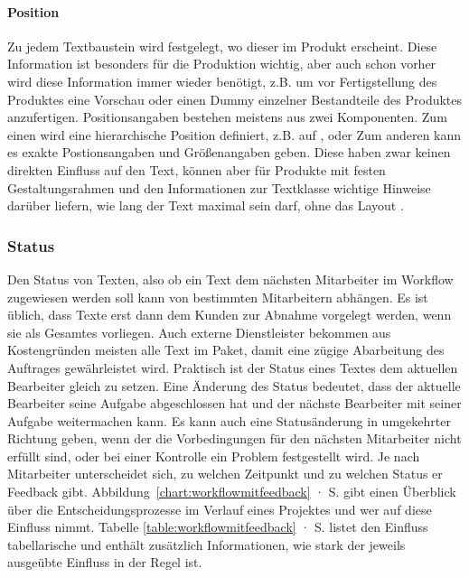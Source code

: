 \paragraph{Position} Zu jedem Textbaustein wird festgelegt, wo dieser im Produkt erscheint. Diese Information ist besonders für die Produktion wichtig, aber auch schon vorher wird diese Information immer wieder benötigt, z.B. um vor Fertigstellung des Produktes eine Vorschau oder einen Dummy einzelner Bestandteile des Produktes anzufertigen. Positionsangaben bestehen meistens aus zwei Komponenten. Zum einen wird eine hierarchische Position definiert, z.B. auf , oder  Zum anderen kann es exakte Postionsangaben und Größenangaben geben. Diese haben zwar keinen direkten Einfluss auf den Text, können aber für Produkte mit festen Gestaltungsrahmen und den Informationen zur Textklasse wichtige Hinweise darüber liefern, wie lang der Text maximal sein darf, ohne das Layout .

\subsubsection{Status}\label{l:konzept-workflow-status}

Den Status von Texten, also ob ein Text dem nächsten Mitarbeiter im Workflow zugewiesen werden soll kann von bestimmten Mitarbeitern abhängen. Es ist üblich, dass Texte erst dann dem Kunden zur Abnahme vorgelegt werden, wenn sie als Gesamtes vorliegen. Auch externe Dienstleister bekommen aus Kostengründen meisten alle Text im Paket, damit eine zügige Abarbeitung des Auftrages gewährleistet wird. Praktisch ist der Status eines Textes dem aktuellen Bearbeiter gleich zu setzen. Eine Änderung des Status bedeutet, dass der aktuelle Bearbeiter seine Aufgabe abgeschlossen hat und der nächste Bearbeiter mit seiner Aufgabe weitermachen kann. Es kann auch eine Statusänderung in umgekehrter Richtung geben, wenn der die Vorbedingungen für den nächsten Mitarbeiter nicht erfüllt sind, oder bei einer Kontrolle ein Problem festgestellt wird. Je nach Mitarbeiter unterscheidet sich, zu welchen Zeitpunkt und zu welchen Status er Feedback gibt. Abbildung~\ref{chart:workflowmitfeedback} · S.\pageref{chart:workflowmitfeedback} gibt einen Überblick über die Entscheidungsprozesse im Verlauf eines Projektes und wer auf diese Einfluss nimmt. Tabelle \ref{table:workflowmitfeedback} · S.\pageref{table:workflowmitfeedback} listet den Einfluss tabellarische und enthält zusätzlich Informationen, wie stark der jeweils ausgeübte Einfluss in der Regel ist.

